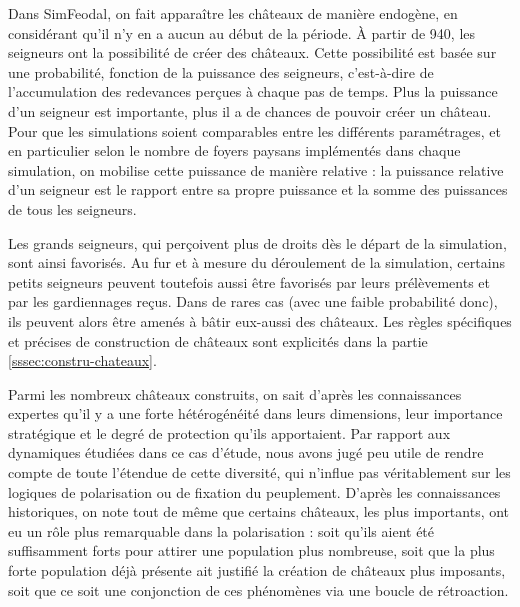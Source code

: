 \begin{tcolorbox}[breakable,left=0pt,right=0pt,top=0pt,bottom=0pt,
	colback=gray!15,colframe=gray!15,width=\dimexpr\textwidth\relax, 
	enlarge left by=0mm, boxsep=5pt,arc=0pt,outer arc=0pt]
	
	Dans SimFeodal, on fait apparaître les châteaux de manière endogène, en considérant qu'il n'y en a aucun au début de la période.
	À partir de 940, les seigneurs ont la possibilité de créer des châteaux.
	Cette possibilité est basée sur une probabilité, fonction de la puissance des seigneurs, c'est-à-dire de l'accumulation des redevances perçues à chaque pas de temps.
	Plus la puissance d'un seigneur est importante, plus il a de chances de pouvoir créer un château.
	Pour que les simulations soient comparables entre les différents paramétrages, et en particulier selon le nombre de foyers paysans implémentés dans chaque simulation, on mobilise cette puissance de manière relative : la puissance relative d'un seigneur est le rapport entre sa propre puissance et la somme des puissances de tous les seigneurs.
	
	\medskip
	Les grands seigneurs, qui perçoivent plus de droits dès le départ de la simulation, sont ainsi favorisés.
	Au fur et à mesure du déroulement de la simulation, certains petits seigneurs peuvent toutefois aussi être favorisés par leurs prélèvements et par les gardiennages reçus.
	Dans de rares cas (avec une faible probabilité donc), ils peuvent alors être amenés à bâtir eux-aussi des châteaux.
	Les règles spécifiques et précises de construction de châteaux sont explicités dans la partie \cref{sssec:constru-chateaux}.
	
\end{tcolorbox}

Parmi les nombreux châteaux construits, on sait d'après les connaissances expertes qu'il y a une forte hétérogénéité dans leurs dimensions, leur importance stratégique et le degré de protection qu'ils apportaient.
Par rapport aux dynamiques étudiées dans ce cas d'étude, nous avons jugé peu utile de rendre compte de toute l'étendue de cette diversité, qui n'influe pas véritablement sur les logiques de polarisation ou de fixation du peuplement.
D'après les connaissances historiques, on note tout de même que certains châteaux, les plus importants, ont eu un rôle plus remarquable dans la polarisation : soit qu'ils aient été suffisamment \og forts\fg{} pour attirer une population plus nombreuse, soit que la plus forte population déjà présente ait justifié la création de châteaux plus imposants, soit que ce soit une conjonction de ces phénomènes via une boucle de rétroaction.

